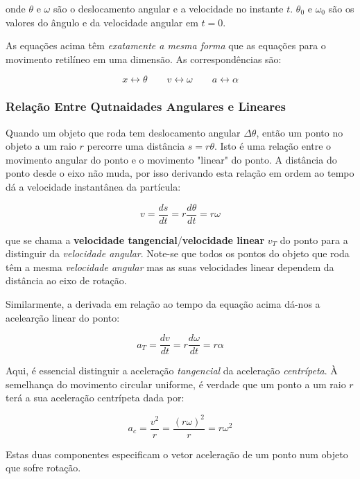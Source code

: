 onde $\theta$ e $\omega$ são o deslocamento angular e a velocidade no instante $t$. $\theta_0$ e $\omega_0$ são os valores do ângulo e da velocidade angular em $t=0$.

As equações acima têm \emph{exatamente a mesma forma} que as equações para o movimento retilíneo em uma dimensão. As correspondências são:

$$
x \leftrightarrow \theta \qquad v \leftrightarrow \omega \qquad a \leftrightarrow \alpha
$$

\subsubsection{Relação Entre Qutnaidades Angulares e Lineares}
Quando um objeto que roda tem deslocamento angular $\Delta \theta$, então um ponto no objeto a um raio $r$ percorre uma distância $s=r\theta$. Isto é uma relação entre o movimento angular do ponto e o movimento "linear" do ponto. A distância do ponto desde o eixo não muda, por isso derivando esta relação em ordem ao tempo dá a velocidade instantânea da partícula:

\begin{equation}
    v=\frac{ds}{dt}=r\frac{d\theta}{dt}=r\omega
\end{equation}

que se chama a \textbf{velocidade tangencial}/\textbf{velocidade linear} $v_T$ do ponto para a distinguir da \emph{velocidade angular}. Note-se que todos os pontos do objeto que roda têm a mesma \emph{velocidade angular} mas as suas velocidades linear dependem da distância ao eixo de rotação.

Similarmente, a derivada em relação ao tempo da equação acima dá-nos a acelearção linear do ponto:

\begin{equation}
    a_T=\frac{dv}{dt}=r\frac{d\omega}{dt}=r\alpha
\end{equation}

Aqui, é essencial distinguir a aceleração \emph{tangencial} da aceleração \emph{centrípeta}. À semelhança do movimento circular uniforme, é verdade que um ponto a um raio $r$ terá a sua aceleração centrípeta dada por:

\begin{equation}
    a_c=\frac{v^2}{r}=\frac{(r\omega)^2}{r}=r\omega^2
\end{equation}

Estas duas componentes especificam o vetor aceleração de um ponto num objeto que sofre rotação.

